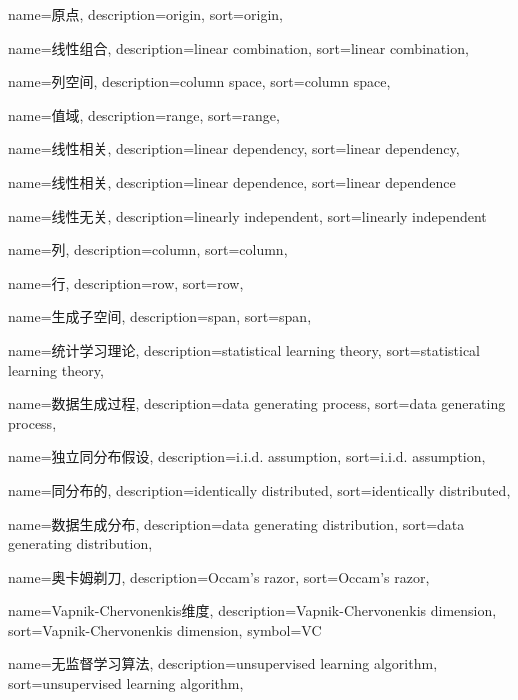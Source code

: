 {
  name=原点,
  description={origin},
  sort={origin},
}

{
  name=线性组合,
  description={linear combination},
  sort={linear combination},
}

{
  name=列空间,
  description={column space},
  sort={column space},
}

{
  name=值域,
  description={range},
  sort={range},
}

{
  name=线性相关,
  description={linear dependency},
  sort={linear dependency},
}

{
  name=线性相关,
  description={linear dependence},
  sort={linear dependence}
}

{
  name=线性无关,
  description={linearly independent},
  sort={linearly independent}
}

{
  name=列,
  description={column},
  sort={column},
}

{
  name=行,
  description={row},
  sort={row},
}

{
  name=生成子空间,
  description={span},
  sort={span},
}

{
  name=统计学习理论,
  description={statistical learning theory},
  sort={statistical learning theory},
}

{
  name=数据生成过程,
  description={data generating process},
  sort={data generating process},
}

{
  name=独立同分布假设,
  description={i.i.d. assumption},
  sort={i.i.d. assumption},
}

{
  name=同分布的,
  description={identically distributed},
  sort={identically distributed},
}

{
  name=数据生成分布,
  description={data generating distribution},
  sort={data generating distribution},
}

{
  name=奥卡姆剃刀,
  description={Occam's razor},
  sort={Occam's razor},
}

{
  name=Vapnik-Chervonenkis维度,
  description={Vapnik-Chervonenkis dimension},
  sort={Vapnik-Chervonenkis dimension},
  symbol={VC}
}

{
  name=无监督学习算法,
  description={unsupervised learning algorithm},
  sort={unsupervised learning algorithm},
}

